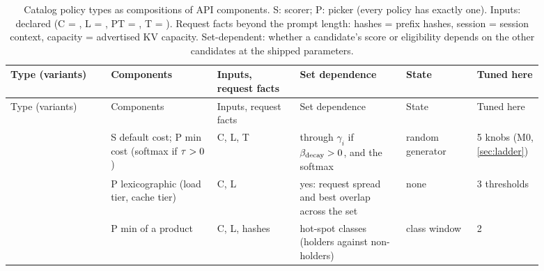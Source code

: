 {\footnotesize
\setlength{\LTcapwidth}{\linewidth}
\setlength{\tabcolsep}{4pt}
\begin{longtable}{@{}P{0.17\linewidth}P{0.18\linewidth}P{0.14\linewidth}P{0.18\linewidth}P{0.12\linewidth}P{0.1\linewidth}@{}}
\caption{Catalog policy types as compositions of API components. S: scorer; P: picker (every
  policy has exactly one). Inputs: declared  (C = , L = ,
  PT = , T = ). Request facts beyond the prompt length:
  hashes = prefix hashes, session = session context, capacity = advertised KV capacity.
  Set-dependent: whether a candidate's score or eligibility depends on the other candidates at the
  shipped parameters.}
\label{tab:api-policies}\\
\toprule
Type (variants) & Components & Inputs, request facts & Set dependence & State & Tuned here \\
\midrule
\endfirsthead
\toprule
Type (variants) & Components & Inputs, request facts & Set dependence & State & Tuned here \\
\midrule
\endhead
\bottomrule
\endfoot
{}\allowbreak{} & S default cost; P min cost (softmax if $\tau > 0$) & C, L, T &
  through $\gamma_i$ if $\beta_{\mathrm{decay}} > 0$, and the softmax & random generator & 5 knobs (M0,
  \cref{sec:ladder}) \\
\allowbreak{} & P lexicographic (load tier, cache tier) & C, L &
  yes: request spread and best overlap across the set & none & 3 thresholds \\
 & P min of a product & C, L, hashes &
  hot-spot classes (holders against non-holders) & class window & 2 \\

\end{longtable}}
